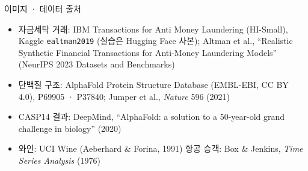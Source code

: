 \documentclass[aspectratio=169,11pt]{beamer}
\begin{document}
\begin{frame}{이미지 · 데이터 출처}
\vfill
\small
\begin{itemize}
\item 자금세탁 거래: IBM Transactions for Anti Money Laundering (HI-Small), Kaggle \texttt{ealtman2019} (실습은 Hugging Face 사본); Altman et al., ``Realistic Synthetic Financial Transactions for Anti-Money Laundering Models'' (NeurIPS 2023 Datasets and Benchmarks)
\item 단백질 구조: AlphaFold Protein Structure Database (EMBL-EBI, CC BY 4.0), P69905 · P37840; Jumper et al., \textit{Nature} 596 (2021)
\item CASP14 결과: DeepMind, ``AlphaFold: a solution to a 50-year-old grand challenge in biology'' (2020)
\item 와인: UCI Wine (Aeberhard \& Forina, 1991) \quad 항공 승객: Box \& Jenkins, \textit{Time Series Analysis} (1976)
\end{itemize}
\vfill
{}
\end{frame}
\end{document}
